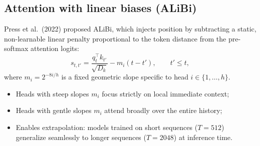 \documentclass[11pt,a4paper]{article}
\newcommand{\slides}[1]{\par\nopagebreak\noindent{\normalfont\small\emph{(slides #1)}}\par\nopagebreak\vspace{2pt}}
\theoremstyle{definition}
\theoremstyle{plain}
\begin{document}
\subsection{Attention with linear biases (ALiBi)}\slides{56 / 84}
Press et al.\ (2022) proposed ALiBi, which injects position by subtracting a static, non-learnable linear penalty proportional to the token distance from the pre-softmax attention logits:
\begin{equation}\label{eq:alibi_def}
s_{t, t'} = \frac{q_t^\top k_{t'}}{\sqrt{D_k}} - m_i (t - t'), \qquad t' \le t,
\end{equation}
where $m_i = 2^{-8i/h}$ is a fixed geometric slope specific to head $i \in \{1, \dots, h\}$.
\begin{itemize}[nosep]
\item Heads with steep slopes $m_i$ focus strictly on local immediate context;
\item Heads with gentle slopes $m_i$ attend broadly over the entire history;
\item Enables extrapolation: models trained on short sequences ($T=512$) generalize seamlessly to longer sequences ($T=2048$) at inference time.
\end{itemize}
\end{document}
